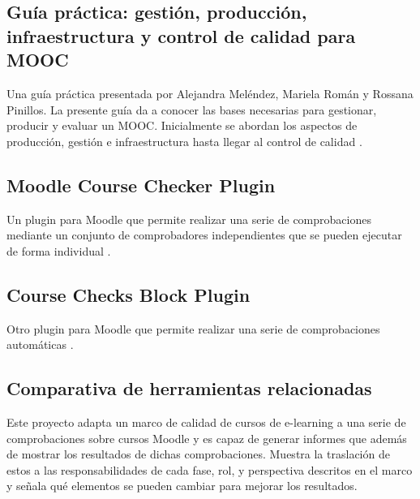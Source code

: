 \subsection{Guía práctica: gestión, producción, infraestructura y control de calidad para MOOC}
Una guía práctica presentada por Alejandra Meléndez, Mariela Román y Rossana Pinillos.
La presente guía da a conocer las bases necesarias para gestionar, producir y evaluar un MOOC. Inicialmente se abordan los aspectos de producción, gestión e infraestructura hasta llegar al control de calidad \cite{guiapractica2016}.

\subsection{Moodle Course Checker Plugin}
Un plugin para Moodle que permite realizar una serie de comprobaciones mediante un conjunto de comprobadores independientes que se pueden ejecutar de forma individual \cite{coursechecker-2021}.

\subsection{Course Checks Block Plugin}
Otro plugin para Moodle que permite realizar una serie de comprobaciones automáticas \cite{coursechecksblock-2018}.

\subsection{Comparativa de herramientas relacionadas}
Este proyecto adapta un marco de calidad de cursos de e-learning a una serie de comprobaciones sobre cursos Moodle y es capaz de generar informes que además de mostrar los resultados de dichas comprobaciones. Muestra la traslación de estos a las responsabilidades de cada fase, rol, y perspectiva descritos en el marco y señala qué elementos se pueden cambiar para mejorar los resultados.

